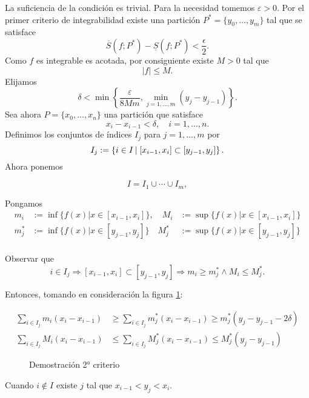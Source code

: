 \begin{demo} La suficiencia de la condición es trivial. Para la necesidad tomemos $\varepsilon>0$. Por el primer criterio de integrabilidad existe una partición $P^*=\{y_0,\ldots,y_m\}$ tal que se satisface
\[
 \overline{S}(f;P^*)-\underline{S}(f;P^*)<\frac{\epsilon}{2}.
\]
Como $f$ es integrable es acotada, por consiguiente existe $M>0$ tal que
\[
 |f|\leq M.
\]
Elijamos 
\[
 \delta<\min\left\{\frac{\varepsilon}{8Mm},\min_{j=1,\ldots,m}(y_j-y_{j-1})   \right\}  .
\]
Sea ahora $P=\{x_0,\ldots,x_n\}$ una partición que satisface
\[
 x_i-x_{i-1}<\delta,\quad i=1,\ldots,n.
\]
Definimos los conjuntos de índices $I_j$ para $j=1,\ldots,m$ por
\[
 I_j:=\left\{ i\in I\left|\vphantom{ \exists }\right.   [x_{i-1},x_i]\subset [y_{j-1},y_j]\right\}.
\]
Ahora ponemos

\begin{equation*}
  I=I_1\cup\cdots\cup I_m,
\end{equation*}

Pongamos
\begin{eqnarray*}
     m_i&:=\inf\{f(x)| x\in [x_{i-1},x_i]\},\quad     M_i&:=\sup\{f(x)| x\in [x_{i-1},x_i]\}\\
    m^*_j&:=\inf\{f(x)| x\in [y_{j-1},y_j]\}\quad
    M^*_j&:=\sup\{f(x)| x\in [y_{j-1},y_j]\}\\
\end{eqnarray*}

Observar que
\[
 i\in I_j\Rightarrow  [x_{i-1},x_i]\subset [y_{j-1},y_j]\Rightarrow
m_i\geq m^*_j \wedge M_i\leq M^*_j.
\]


Entonces, tomando en consideración la figura \ref{fig:crite2}:

\begin{equation}\label{eq:2drite_estima_suma}
 \begin{split}
   \sum_{i\in I_j}m_i(x_i-x_{i-1})&\geq \sum_{i\in I_j}m^*_j(x_i-x_{i-1}) \geq  m^*_j(y_j-y_{j-1}-2\delta)\\
 \sum_{i\in I_j}M_i(x_i-x_{i-1})&\leq \sum_{i\in I_j}M^*_j(x_i-x_{i-1}) \leq  M^*_j(y_j-y_{j-1})
 \end{split}
\end{equation}
\begin{figure}[H]
 \begin{center}

 \end{center}
 \caption{Demostración 2° criterio}\label{fig:crite2}
\end{figure}

Cuando  $i\notin I $  existe $j$ tal que $x_{i-1}<y_j<x_i$. 


\end{demo}
